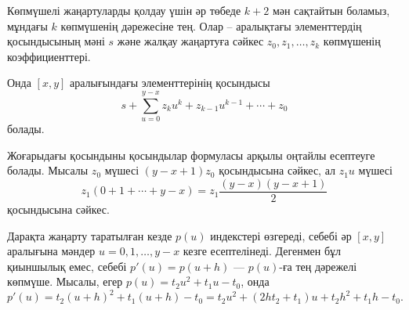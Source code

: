 
Көпмүшелі жаңартуларды қолдау үшін
әр төбеде $k+2$ мән сақтайтын боламыз,
мұндағы $k$ көпмүшенің дәрежесіне тең. 
Олар -- аралықтағы элементтердің қосындысының мәні $s$ және
жалқау жаңартуға сәйкес $z_0,z_1,\ldots,z_k$ көпмүшенің коэффициенттері. 


Онда $[x,y]$ аралығындағы элементтерінің қосындысы 
\[s+\sum_{u=0}^{y-x} z_k u^k + z_{k-1} u^{k-1} + \cdots + z_0\] 
болады.


Жоғарыдағы қосындыны қосындылар формуласы арқылы оңтайлы
есептеуге болады. Мысалы $z_0$ мүшесі $(y-x+1)z_0$ қосындысына
сәйкес, ал $z_1 u$ мүшесі 
\[z_1(0+1+\cdots+y-x) = z_1 \frac{(y-x)(y-x+1)}{2}\]
қосындысына сәйкес. 


Дарақта жаңарту таратылған кезде $p(u)$ индекстері 
өзгереді, себебі әр $[x,y]$ аралығына мәндер 
$u=0,1,\ldots,y-x$ кезге есептелінеді. 
Дегенмен бұл қиыншылық емес, себебі 
$p'(u)=p(u+h)$ –– $p(u)$-ға тең дәрежелі көпмүше.
Мысалы, егер $p(u)=t_2 u^2+t_1 u-t_0$, онда
\[p'(u)=t_2(u+h)^2+t_1(u+h)-t_0=t_2 u^2 + (2ht_2+t_1)u+t_2h^2+t_1h-t_0.\]


